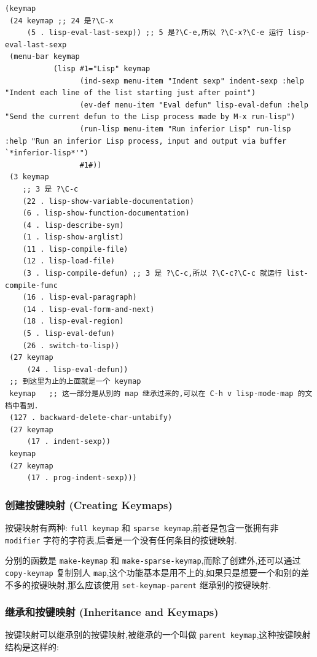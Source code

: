 \documentclass[11pt]{article}
\begin{document}
\begin{verbatim}
(keymap
 (24 keymap ;; 24 是?\C-x
     (5 . lisp-eval-last-sexp)) ;; 5 是?\C-e,所以 ?\C-x?\C-e 运行 lisp-eval-last-sexp
 (menu-bar keymap
           (lisp #1="Lisp" keymap
                 (ind-sexp menu-item "Indent sexp" indent-sexp :help "Indent each line of the list starting just after point")
                 (ev-def menu-item "Eval defun" lisp-eval-defun :help "Send the current defun to the Lisp process made by M-x run-lisp")
                 (run-lisp menu-item "Run inferior Lisp" run-lisp :help "Run an inferior Lisp process, input and output via buffer `*inferior-lisp*'")
                 #1#))
 (3 keymap
    ;; 3 是 ?\C-c
    (22 . lisp-show-variable-documentation)
    (6 . lisp-show-function-documentation)
    (4 . lisp-describe-sym)
    (1 . lisp-show-arglist)
    (11 . lisp-compile-file)
    (12 . lisp-load-file)
    (3 . lisp-compile-defun) ;; 3 是 ?\C-c,所以 ?\C-c?\C-c 就运行 list-compile-func
    (16 . lisp-eval-paragraph)
    (14 . lisp-eval-form-and-next)
    (18 . lisp-eval-region)
    (5 . lisp-eval-defun)
    (26 . switch-to-lisp))
 (27 keymap
     (24 . lisp-eval-defun))
 ;; 到这里为止的上面就是一个 keymap
 keymap   ;; 这一部分是从别的 map 继承过来的,可以在 C-h v lisp-mode-map 的文档中看到.
 (127 . backward-delete-char-untabify)
 (27 keymap
     (17 . indent-sexp))
 keymap
 (27 keymap
     (17 . prog-indent-sexp)))
\end{verbatim}


\subsubsection{创建按键映射 (Creating Keymaps)}
\label{sec:orge2c5b4b}

按键映射有两种: \texttt{full keymap} 和 \texttt{sparse keymap},前者是包含一张拥有非 \texttt{modifier} 字符的字符表,后者是一个没有任何条目的按键映射.

分别的函数是 \texttt{make-keymap} 和 \texttt{make-sparse-keymap},而除了创建外,还可以通过 \texttt{copy-keymap} 复制别人 \texttt{map},这个功能基本是用不上的,如果只是想要一个和别的差不多的按键映射,那么应该使用 \texttt{set-keymap-parent} 继承别的按键映射.


\subsubsection{继承和按键映射 (Inheritance and Keymaps)}
\label{sec:org38144ae}

按键映射可以继承别的按键映射,被继承的一个叫做 \texttt{parent keymap},这种按键映射结构是这样的:
\end{document}
